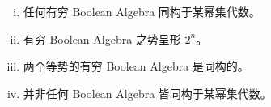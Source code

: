 \begin{frame}{}
  \begin{theorem}
    \begin{enumerate}[(i)]
      \setlength{\itemsep}{8pt}
      \item 任何有穷 Boolean Algebra 同构于某幂集代数。
      \item 有穷 Boolean Algebra 之势呈形 $2^n$。
      \item 两个等势的有穷 Boolean Algebra 是同构的。
      \item 并非任何 Boolean Algebra 皆同构于某幂集代数。
    \end{enumerate}
  \end{theorem}
\end{frame}
